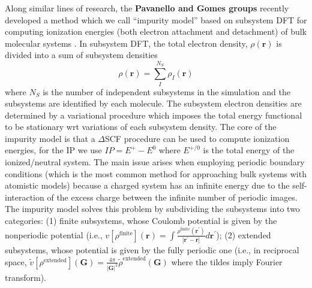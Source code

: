 \documentclass[notitlepage,12pt]{report}
\def\br{{\mathbf{r}}}
\def\bG{{\mathbf{G}}}
\def\brp{{\mathbf{r}^\prime}}
\begin{document}
    Along similar lines of research, the {\bf Pavanello and Gomes groups} recently developed a method which we call ``impurity model'' based on subsystem DFT \supercite{jacob2014subsystem,wesolowski2015frozen,krishtal2015subsystem} for computing ionization energies (both electron attachment and detachment) of bulk molecular systems \supercite{tolle2019charged}. In subsystem DFT,  the total electron density, $\rho(\br)$ is divided into a sum of subsystem densities 
\begin{equation}
    \label{dens}
    \rho(\br) = \sum_I^{N_S}\rho_I(\br)
\end{equation}
    where $N_S$ is the number of independent subsystems in the simulation and the subsystems are identified by each molecule. The subsystem electron densities are determined by a variational procedure which imposes the total energy functional to be stationary wrt variations of each subsystem density. The core of the impurity model is that a $\Delta$SCF procedure\supercite{bagus1965self,waskom2017mwaskom} can be used to compute ionization energies, for the IP we use $IP=E^+-E^0$ where $E^{+/0}$ is the total energy of the ionized/neutral system. The main issue arises when employing periodic boundary conditions (which is the most common method for approaching bulk systems with atomistic models) because a charged system has an infinite energy due to the self-interaction of the excess charge between the infinite number of periodic images. The impurity model solves this problem by subdividing the subsystems into two categories: (1) finite subsystems, whose Coulomb potential is given by the nonperiodic potential (i.e., $v[\rho^{\text{finite}}](\br)=\int\frac{\rho^{\text{finite}}(\brp)}{|\brp-\br|}d\brp$); (2) extended subsystems, whose potential is given by the fully periodic one (i.e., in reciprocal space, $\tilde v[\rho^{\text{extended}}](\bG)=\frac{4\pi}{|\bG|^2}\tilde\rho^\text{extended}(\bG)$ where the tildes imply Fourier transform).
\end{document}
